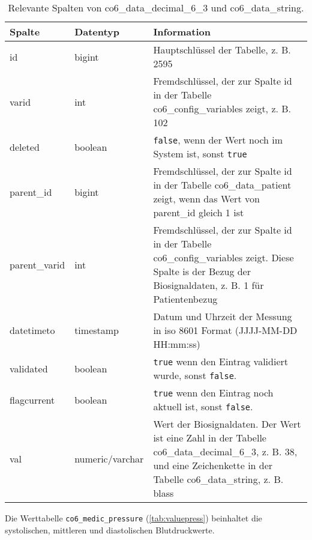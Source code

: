 \begin{longtable}{|l|l|p{7cm}|}
	\caption[Relevante Spalten von co6\_data\_decimal\_6\_3 und \\ co6\_data\_string]{Relevante Spalten von co6\_data\_decimal\_6\_3 und co6\_data\_string.}
	\label{tab:valuetab}
	\endfirsthead
		\hline
		\bfseries Spalte & \bfseries Datentyp & \bfseries Information \\ \hline
		id & bigint & Hauptschlüssel der Tabelle, z. B. 2595 \\ \hline
		varid & int & Fremdschlüssel, der zur Spalte id in der Tabelle co6\_config\_variables zeigt, z. B. 102 \\ \hline
		deleted & boolean & \texttt{false}, wenn der Wert noch im System ist, sonst \texttt{true} \\ \hline
		parent\_id & bigint & Fremdschlüssel, der zur Spalte id in der Tabelle co6\_data\_patient zeigt, wenn das Wert von parent\_id gleich 1 ist \\ \hline
		parent\_varid & int & Fremdschlüssel, der zur Spalte id in der Tabelle co6\_config\_variables zeigt. Diese Spalte is der Bezug der Biosignaldaten, z. B. 1 für Patientenbezug \\ \hline
		datetimeto & timestamp & Datum und Uhrzeit der Messung in \acs{iso} 8601 Format (JJJJ-MM-DD HH:mm:ss)\\ \hline
		validated & boolean & \texttt{true} wenn den Eintrag validiert wurde, sonst \texttt{false}. \\ \hline
		flagcurrent & boolean & \texttt{true} wenn den Eintrag noch aktuell ist, sonst \texttt{false}. \\ \hline
		val & numeric/varchar & Wert der Biosignaldaten. Der Wert ist eine Zahl in der Tabelle co6\_data\_decimal\_6\_3, z. B. 38, und eine Zeichenkette in der Tabelle co6\_data\_string, z. B. blass \\ \hline
\end{longtable}

Die Werttabelle \texttt{co6\_medic\_pressure} (\ref{tab:valuepress}) beinhaltet die systolischen, mittleren und diastolischen Blutdruckwerte.

